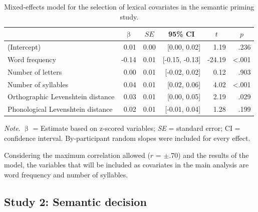 \documentclass[
  12pt,
  man,floatsintext]{apa7}
\begin{document}
\begin{table}[H]

\caption{\label{tab:semanticpriming-lexical-covariates-selection}Mixed-effects model for the selection of lexical covariates in the semantic priming study.}
\centering
\begin{threeparttable}
\begin{tabular}[t]{lrrrrr}
\toprule
\multicolumn{1}{c}{ } & \multicolumn{1}{c}{$\upbeta$} & \multicolumn{1}{c}{$SE$} & \multicolumn{1}{c}{95\% CI} & \multicolumn{1}{c}{$t$} & \multicolumn{1}{c}{$p$}\\
\midrule
(Intercept) & 0.01 & 0.00 & {}[0.00, 0.02] & 1.19 & .236\\
Word frequency & -0.14 & 0.01 & {}[-0.15, -0.13] & -24.19 & <.001\\
Number of letters & 0.00 & 0.01 & {}[-0.02, 0.02] & 0.12 & .903\\
Number of syllables & 0.04 & 0.01 & {}[0.02, 0.06] & 4.02 & <.001\\
Orthographic Levenshtein distance & 0.03 & 0.01 & {}[0.00, 0.05] & 2.19 & .029\\
Phonological Levenshtein distance & 0.02 & 0.01 & {}[-0.01, 0.04] & 1.28 & .199\\
\bottomrule
\end{tabular}
\begin{tablenotes}
\item \textit{\linebreak} 
\item \textit{Note}. $\upbeta$ = Estimate based on z-scored variables; \textit{SE} = standard error; \linebreak \phantom{.}CI = confidence interval. By-participant random slopes were included for \linebreak \phantom{.}every effect.
\end{tablenotes}
\end{threeparttable}
\end{table}

Considering the maximum correlation allowed (\(r\) = \(\pm\).70) and the results of the model, the variables that will be included as covariates in the main analysis are word frequency and number of syllables.

\hypertarget{study-2-semantic-decision-1}{%
\subsection{Study 2: Semantic decision}\label{study-2-semantic-decision-1}}
\end{document}
